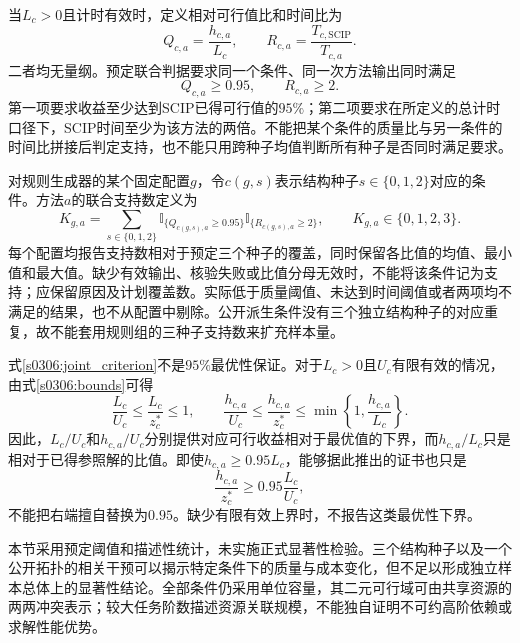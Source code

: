 当$L_c>0$且计时有效时，定义相对可行值比和时间比为
\begin{equation}
 Q_{c,a}=\frac{h_{c,a}}{L_c},\qquad
 R_{c,a}=\frac{T_{c,\mathrm{SCIP}}}{T_{c,a}}.
 \label{s0306:comparison_ratios}
\end{equation}
二者均无量纲。预定联合判据要求同一个条件、同一次方法输出同时满足
\begin{equation}
 Q_{c,a}\geq0.95,
 \qquad R_{c,a}\geq2.
 \label{s0306:joint_criterion}
\end{equation}
第一项要求收益至少达到SCIP已得可行值的$95\%$；第二项要求在所定义的总计时口径下，SCIP时间至少为该方法的两倍。不能把某个条件的质量比与另一条件的时间比拼接后判定支持，也不能只用跨种子均值判断所有种子是否同时满足要求。

对规则生成器的某个固定配置$g$，令$c(g,s)$表示结构种子$s\in\{0,1,2\}$对应的条件。方法$a$的联合支持数定义为
\begin{equation}
 K_{g,a}=\sum_{s\in\{0,1,2\}}
 \mathbb{I}_{\{Q_{c(g,s),a}\geq0.95\}}
 \mathbb{I}_{\{R_{c(g,s),a}\geq2\}},
 \qquad K_{g,a}\in\{0,1,2,3\}.
 \label{s0306:support_count}
\end{equation}
每个配置均报告支持数相对于预定三个种子的覆盖，同时保留各比值的均值、最小值和最大值。缺少有效输出、核验失败或比值分母无效时，不能将该条件记为支持；应保留原因及计划覆盖数。实际低于质量阈值、未达到时间阈值或者两项均不满足的结果，也不从配置中剔除。公开派生条件没有三个独立结构种子的对应重复，故不能套用规则组的三种子支持数来扩充样本量。

式\eqref{s0306:joint_criterion}不是$95\%$最优性保证。对于$L_c>0$且$U_c$有限有效的情况，由式\eqref{s0306:bounds}可得
\begin{equation}
 \frac{L_c}{U_c}\leq\frac{L_c}{z_c^*}\leq1,
 \qquad
 \frac{h_{c,a}}{U_c}\leq\frac{h_{c,a}}{z_c^*}
 \leq\min\left\{1,\frac{h_{c,a}}{L_c}\right\}.
 \label{s0306:quality_certificate}
\end{equation}
因此，$L_c/U_c$和$h_{c,a}/U_c$分别提供对应可行收益相对于最优值的下界，而$h_{c,a}/L_c$只是相对于已得参照解的比值。即使$h_{c,a}\geq0.95L_c$，能够据此推出的证书也只是
\begin{equation}
 \frac{h_{c,a}}{z_c^*}\geq
 0.95\frac{L_c}{U_c},
 \label{s0306:threshold_certificate}
\end{equation}
不能把右端擅自替换为$0.95$。缺少有限有效上界时，不报告这类最优性下界。

本节采用预定阈值和描述性统计，未实施正式显著性检验。三个结构种子以及一个公开拓扑的相关干预可以揭示特定条件下的质量与成本变化，但不足以形成独立样本总体上的显著性结论。全部条件仍采用单位容量，其二元可行域可由共享资源的两两冲突表示；较大任务阶数描述资源关联规模，不能独自证明不可约高阶依赖或求解性能优势。
